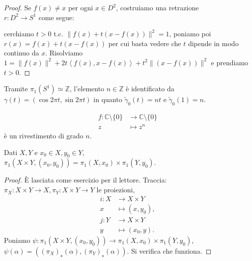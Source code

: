 \begin{proof}
  Se $f(x)\not=x$ per ogni $x \in D^2$, costruiamo una retrazione \\
  $r:D^2 \rightarrow S^1$ come segue:
  \begin{center}
\end{center}
cerchiamo $t>0$ t.c. $\|f(x)+t(x-f(x))\|^2=1$, poniamo poi $r(x)=f(x)+t(x-f(x))$ per cui basta vedere che $t$ dipende in modo continuo da $x$. Risolviamo $1=\|f(x)\|^2+2t\left \langle f(x), x-f(x) \right \rangle+t^2\|(x-f(x))\|^2$ e prendiamo $t>0$.
\end{proof}

\begin{oss}
  Tramite $\pi_1(S^1) \simeq \mathbb{Z}$, l'elemento $n \in \mathbb{Z}$ è identificato da $\gamma(t)=(\cos{2\pi t}, \sin{2\pi t})$ in quanto $\tilde{\gamma}_0(t)=nt$ e $\tilde{\gamma}_0(1)=n$.
\end{oss}

\begin{exc}
  \begin{align*}
    f:\mathbb{C} \setminus \{0\} &\longrightarrow \mathbb{C} \setminus \{0\} \\
    z &\longmapsto z^n
  \end{align*}
  è un rivestimento di grado $n$.
\end{exc}

\begin{thm}
  Dati $X, Y$ e $x_0 \in X, y_0 \in Y$, \\ $\pi_1(X \times Y, (x_0, y_0))=\pi_1(X, x_0) \times \pi_1(Y, y_0)$.
\end{thm}

\begin{proof}
  È lasciata come esercizio per il lettore. Traccia: $\pi_X:X \times Y \rightarrow X, \pi_Y:X \times Y \rightarrow Y$ le proiezioni,
  \begin{align*}
    i:X &\longrightarrow X \times Y \\
    x &\longmapsto (x, y_0), \\
    j:Y &\longrightarrow X \times Y \\
    y &\longmapsto (x_0, y).
  \end{align*}
  Poniamo $\psi:\pi_1(X \times Y, (x_0, y_0)) \rightarrow \pi_1(X, x_0) \times \pi_1(Y, y_0)$, $\psi(\alpha)=((\pi_X)_{\star}(\alpha), (\pi_Y)_{\star}(\alpha))$. Si verifica che funziona.
\end{proof}

